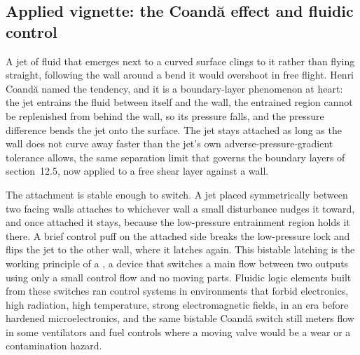 \subsection*{Applied vignette: the Coand\u{a} effect and fluidic control}

A jet of fluid that emerges next to a curved surface clings to it rather
than flying straight, following the wall around a bend it would overshoot
in free flight. Henri Coand\u{a} named the tendency, and it is a
boundary-layer phenomenon at heart: the jet entrains the fluid between
itself and the wall, the entrained region cannot be replenished from
behind the wall, so its pressure falls, and the pressure difference bends
the jet onto the surface. The jet stays attached as long as the wall does
not curve away faster than the jet's own adverse-pressure-gradient
tolerance allows, the same separation limit that governs the boundary
layers of section~12.5, now applied to a free shear layer against a wall.

The attachment is stable enough to switch. A jet placed symmetrically
between two facing walls attaches to whichever wall a small disturbance
nudges it toward, and once attached it stays, because the low-pressure
entrainment region holds it there. A brief control puff on the attached
side breaks the low-pressure lock and flips the jet to the other wall,
where it latches again. This bistable latching is the working principle
of a , a device that switches a main flow
between two outputs using only a small control flow and no moving parts.
Fluidic logic elements built from these switches ran control systems in
environments that forbid electronics, high radiation, high temperature,
strong electromagnetic fields, in an era before hardened microelectronics,
and the same bistable Coand\u{a} switch still meters flow in some
ventilators and fuel controls where a moving valve would be a wear or a
contamination hazard.


